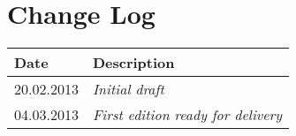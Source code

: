 \section{Change Log}
\label{sec:changelog}
\begin{tabular}{|l|l|}
\hline
Date & Description \\ \hline
20.02.2013 & \emph{Initial draft\/} \\ \hline
04.03.2013 & \emph{First edition ready for delivery\/} \\ \hline
\end{tabular}
